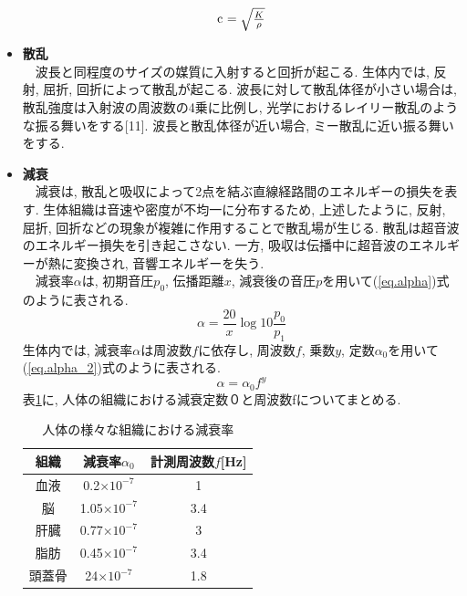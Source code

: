 \begin{itemize}
\begin{equation}
\label{eq.c}
$c$\ = \sqrt{\frac{K}{\rho}}
\end{equation}
\item{\bf 散乱}
\\\ \ 波長と同程度のサイズの媒質に入射すると回折が起こる. 生体内では, 反射, 屈折, 回折によって散乱が起こる. 波長に対して散乱体径が小さい場合は, 散乱強度は入射波の周波数の4乗に比例し, 光学におけるレイリー散乱のような振る舞いをする[11]. 波長と散乱体径が近い場合, ミー散乱に近い振る舞いをする. 
\item{\bf 減衰}
\\\ \ 減衰は, 散乱と吸収によって2点を結ぶ直線経路間のエネルギーの損失を表す. 生体組織は音速や密度が不均一に分布するため, 上述したように, 反射, 屈折, 回折などの現象が複雑に作用することで散乱場が生じる. 散乱は超音波のエネルギー損失を引き起こさない. 一方, 吸収は伝播中に超音波のエネルギーが熱に変換され, 音響エネルギーを失う.
\\\ \ 減衰率$\alpha$は, 初期音圧$p_0$, 伝播距離$x$, 減衰後の音圧$p$を用いて(\ref{eq.alpha})式のように表される.
\begin{equation}
\label{eq.alpha}
\alpha = \frac{20}{x}  \log{10} \frac{p_0}{p_1}
\end{equation}
生体内では, 減衰率$\alpha$は周波数$f$に依存し, 周波数$f$, 乗数$y$, 定数$\alpha_0$を用いて(\ref{eq.alpha_2})式のように表される.
\begin{equation}
\label{eq.alpha_2}
\alpha = \alpha_0f^y
\end{equation}
表\ref{table_soshiki}に, 人体の組織における減衰定数０と周波数fについてまとめる.

\begin{table}[htb]
\centering
\caption{人体の様々な組織における減衰率}
\label{table_soshiki}
\begin{tabular}{|c|c|c|}
\hline
組織 & 減衰率$\alpha_0$ & 計測周波数$f$[Hz]  \\ \hline
血液 & 0.2$\times$$10^{-7}$ &      1 \\ \hline
脳   & 1.05$\times$$10^{-7}$ &      3.4\\ \hline
肝臓  & 0.77$\times$$10^{-7}$ &     3 \\ \hline
脂肪 & 0.45$\times$$10^{-7}$ &     3.4 \\ \hline
頭蓋骨  & 24$\times$$10^{-7}$ &     1.8  \\ \hline
\end{tabular}
\end{table}

\end{itemize}
